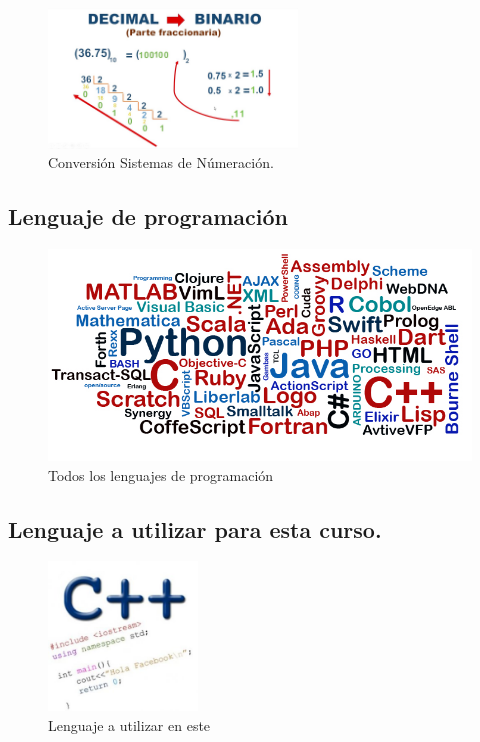 \documentclass[presentation, aspectratio=54]{beamer}
\begin{document}
\begin{figure}[htbp]
\centering
\includegraphics[width=250px]{./images/DecimalBinario.jpg}
\caption{Conversión Sistemas de Númeración.}
\end{figure}



\subsection{Lenguaje de programación}
\label{sec:org286ddff}

\begin{figure}[htbp]
\centering
\includegraphics[width=.9\linewidth]{./images/LenguajesDeProgramacion.jpg}
\caption{Todos los lenguajes de programación}
\end{figure}
\subsection{Lenguaje a utilizar para esta curso.}
\label{sec:org6be5a09}

\begin{figure}[htbp]
\centering
\includegraphics[width=150px]{./images/cpp.jpg}
\caption{Lenguaje a utilizar en este}
\end{figure}
\end{document}
